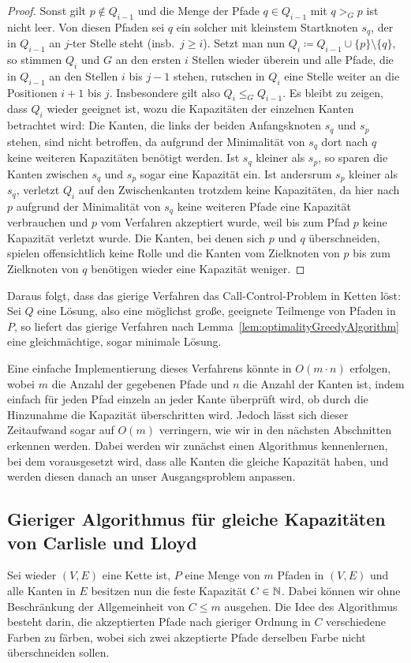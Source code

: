 \begin{proof}
    Sonst gilt $p \notin Q_{i-1}$ und die Menge der Pfade $q \in Q_{i-1}$ mit $q >_G p$ ist nicht leer.
    Von diesen Pfaden sei $q$ ein solcher mit kleinstem Startknoten $s_q$, der in $Q_{i-1}$ an $j$-ter Stelle steht
    (insb.\ $j \geq i$).
    Setzt man nun $Q_{i} \coloneqq Q_{i-1} \cup \{ p \} \setminus \{ q \} $, so stimmen $Q_{i}$ und $G$ an den
    ersten $i$ Stellen wieder überein und alle Pfade, die in $Q_{i-1}$ an den Stellen $i$ bis $j-1$ stehen, rutschen
    in $Q_i$ eine Stelle weiter an die Positionen $i+1$ bis $j$.
    Insbesondere gilt also $Q_i \leq_G Q_{i-1}$.
    Es bleibt zu zeigen, dass $Q_i$ wieder geeignet ist, wozu die Kapazitäten der einzelnen Kanten betrachtet wird:
    Die Kanten, die links der beiden Anfangsknoten $s_q$ und $s_p$ stehen, sind nicht betroffen, da aufgrund der Minimalität
    von $s_q$ dort nach $q$ keine weiteren Kapazitäten benötigt werden.
    Ist $s_q$ kleiner als $s_p$, so sparen die Kanten zwischen $s_q$ und $s_p$ sogar eine Kapazität ein.
    Ist andersrum $s_p$ kleiner als $s_q$, verletzt $Q_i$ auf den Zwischenkanten trotzdem keine Kapazitäten, da
    hier nach $p$ aufgrund der Minimalität von $s_q$ keine weiteren Pfade eine Kapazität verbrauchen und $p$ vom
    Verfahren akzeptiert wurde, weil bis zum Pfad $p$ keine Kapazität verletzt wurde.
    Die Kanten, bei denen sich $p$ und $q$ überschneiden, spielen offensichtlich keine Rolle und die Kanten
    vom Zielknoten von $p$ bis zum Zielknoten von $q$ benötigen wieder eine Kapazität weniger.
\end{proof}

Daraus folgt, dass das gierige Verfahren das Call-Control-Problem in Ketten löst:
Sei $Q$ eine Lösung, also eine möglichst große, geeignete Teilmenge von Pfaden in $P$, so liefert das gierige
Verfahren nach Lemma~\ref{lem:optimalityGreedyAlgorithm} eine gleichmächtige, sogar minimale Lösung.

Eine einfache Implementierung dieses Verfahrens könnte in $O(m \cdot n)$ erfolgen, wobei $m$ die Anzahl der gegebenen
Pfade und $n$ die Anzahl der Kanten ist, indem einfach für jeden Pfad einzeln an jeder Kante überprüft wird, ob durch
die Hinzunahme die Kapazität überschritten wird.
Jedoch lässt sich dieser Zeitaufwand sogar auf $O(m)$ verringern, wie wir in den nächsten Abschnitten erkennen werden.
Dabei werden wir zunächst einen Algorithmus kennenlernen, bei dem vorausgesetzt wird, dass alle Kanten die gleiche
Kapazität haben, und werden diesen danach an unser Ausgangsproblem anpassen.

\subsection{Gieriger Algorithmus für gleiche Kapazitäten von Carlisle und Lloyd}\label{subsec:algorithmusGleicheKapazitäten}
Sei wieder $(V,E)$ eine Kette ist, $P$ eine Menge von $m$ Pfaden in $(V,E)$ und alle Kanten in $E$ besitzen nun die
feste Kapazität $C \in \mathbb N$.
Dabei können wir ohne Beschränkung der Allgemeinheit von $C \leq m$ ausgehen.
Die Idee des Algorithmus besteht darin, die akzeptierten Pfade nach gieriger Ordnung in $C$ verschiedene Farben zu
färben, wobei sich zwei akzeptierte Pfade derselben Farbe nicht überschneiden sollen.

